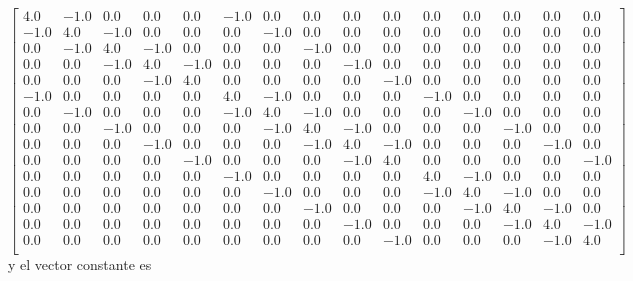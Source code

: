 \documentclass[a4paper]{article}
\begin{document}
\begin{equation}
\begin{bmatrix}
 4.0 & -1.0 &  0.0 &  0.0 &  0.0 & -1.0 &  0.0 &  0.0 &  0.0 &  0.0 &  0.0 &  0.0 &  0.0 &  0.0 &  0.0 \\
-1.0 &  4.0 & -1.0 &  0.0 &  0.0 &  0.0 & -1.0 &  0.0 &  0.0 &  0.0 &  0.0 &  0.0 &  0.0 &  0.0 &  0.0 \\
 0.0 & -1.0 &  4.0 & -1.0 &  0.0 &  0.0 &  0.0 & -1.0 &  0.0 &  0.0 &  0.0 &  0.0 &  0.0 &  0.0 &  0.0 \\
 0.0 &  0.0 & -1.0 &  4.0 & -1.0 &  0.0 &  0.0 &  0.0 & -1.0 &  0.0 &  0.0 &  0.0 &  0.0 &  0.0 &  0.0 \\
 0.0 &  0.0 &  0.0 & -1.0 &  4.0 &  0.0 &  0.0 &  0.0 &  0.0 & -1.0 &  0.0 &  0.0 &  0.0 &  0.0 &  0.0 \\
-1.0 &  0.0 &  0.0 &  0.0 &  0.0 &  4.0 & -1.0 &  0.0 &  0.0 &  0.0 & -1.0 &  0.0 &  0.0 &  0.0 &  0.0 \\
 0.0 & -1.0 &  0.0 &  0.0 &  0.0 & -1.0 &  4.0 & -1.0 &  0.0 &  0.0 &  0.0 & -1.0 &  0.0 &  0.0 &  0.0 \\
 0.0 &  0.0 & -1.0 &  0.0 &  0.0 &  0.0 & -1.0 &  4.0 & -1.0 &  0.0 &  0.0 &  0.0 & -1.0 &  0.0 &  0.0 \\
 0.0 &  0.0 &  0.0 & -1.0 &  0.0 &  0.0 &  0.0 & -1.0 &  4.0 & -1.0 &  0.0 &  0.0 &  0.0 & -1.0 &  0.0 \\
 0.0 &  0.0 &  0.0 &  0.0 & -1.0 &  0.0 &  0.0 &  0.0 & -1.0 &  4.0 &  0.0 &  0.0 &  0.0 &  0.0 & -1.0 \\
 0.0 &  0.0 &  0.0 &  0.0 &  0.0 & -1.0 &  0.0 &  0.0 &  0.0 &  0.0 &  4.0 & -1.0 &  0.0 &  0.0 &  0.0 \\
 0.0 &  0.0 &  0.0 &  0.0 &  0.0 &  0.0 & -1.0 &  0.0 &  0.0 &  0.0 & -1.0 &  4.0 & -1.0 &  0.0 &  0.0 \\
 0.0 &  0.0 &  0.0 &  0.0 &  0.0 &  0.0 &  0.0 & -1.0 &  0.0 &  0.0 &  0.0 & -1.0 &  4.0 & -1.0 &  0.0 \\
 0.0 &  0.0 &  0.0 &  0.0 &  0.0 &  0.0 &  0.0 &  0.0 & -1.0 &  0.0 &  0.0 &  0.0 & -1.0 &  4.0 & -1.0 \\
 0.0 &  0.0 &  0.0 &  0.0 &  0.0 &  0.0 &  0.0 &  0.0 &  0.0 & -1.0 &  0.0 &  0.0 &  0.0 & -1.0 &  4.0 \\
\end{bmatrix}
\end{equation}
y el vector constante es 
\end{document}
